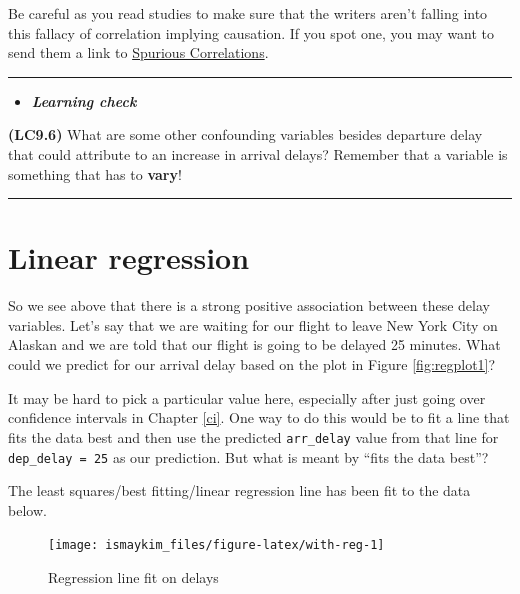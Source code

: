 \documentclass[]{tufte-book}
\let\oldrule=\rule
\renewcommand{\rule}[1]{\oldrule{\linewidth}}
\newenvironment{rmdblock}[1]
  {\begin{shaded*}
  \begin{itemize}
  \renewcommand{\labelitemi}{
    \raisebox{-.7\height}[0pt][0pt]{
    }
  }
  \item
  }
  {
  \end{itemize}
  \end{shaded*}
  }
\newenvironment{learncheck}
  {\begin{rmdblock}{warning}}
  {\end{rmdblock}}
\begin{document}
Be careful as you read studies to make sure that the writers aren't
falling into this fallacy of correlation implying causation. If you spot
one, you may want to send them a link to
\href{http://www.tylervigen.com/spurious-correlations}{Spurious
Correlations}.

\begin{center}\rule{0.5\linewidth}{\linethickness}\end{center}

\begin{learncheck}
\textbf{\emph{Learning check}}
\end{learncheck}

\textbf{(LC9.6)} What are some other confounding variables besides
departure delay that could attribute to an increase in arrival delays?
Remember that a variable is something that has to \textbf{vary}!

\begin{center}\rule{0.5\linewidth}{\linethickness}\end{center}

\section{Linear regression}\label{linear-regression}

So we see above that there is a strong positive association between
these delay variables. Let's say that we are waiting for our flight to
leave New York City on Alaskan and we are told that our flight is going
to be delayed 25 minutes. What could we predict for our arrival delay
based on the plot in Figure \ref{fig:regplot1}?

It may be hard to pick a particular value here, especially after just
going over confidence intervals in Chapter \ref{ci}. One way to do this
would be to fit a line that fits the data best and then use the
predicted \texttt{arr\_delay} value from that line for
\texttt{dep\_delay\ =\ 25} as our prediction. But what is meant by
``fits the data best''?

The least squares/best fitting/linear regression line has been fit to
the data below.

\begin{figure}

{\centering \texttt{[image: ismaykim\_files/figure-latex/with-reg-1]} 

}

\caption[Regression line fit on delays]{Regression line fit on delays}\label{fig:with-reg}
\end{figure}
\end{document}
